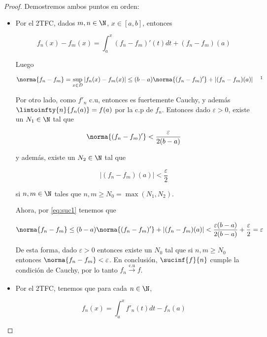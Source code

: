 \begin{proof}
    Demostremos ambos puntos en orden:
    
    \begin{itemize}
        \item Por el 2TFC, dados $m,n \in \N$, $x \in [a,b]$, entonces
    
        \[
        f_n(x) - f_m(x) = \int_a^x (f_n - f_m)'(t)dt + (f_n - f_m)(a)
        \]
        
        Luego
        
        \begin{equation}\label{eq:suc1}
            \norma{f_n - f_m} = \sup_{x \in D} \left| f_n(x) - f_m(x) \right| \leq (b-a)\norma{(f_n - f_m)'} + \left| (f_n - f_m)(a) \right| \quad \footnotemark
        \end{equation}
        
        Por otro lado, como $f'_n$ c.u, entonces es fuertemente Cauchy, y además $\limtoinfty{n}{f_n(a)} = f(a)$ por la c.p de $f_n$. Entonces dado $\varepsilon > 0$, existe un $N_1 \in \N$ tal que
        
        \[
        \norma{(f_n - f_m)'} < \frac{\varepsilon}{2(b-a)}
        \]
        
        \noindent y además, existe un $N_2 \in \N$ tal que
        
        \[
        \left| (f_n - f_m)(a) \right| < \frac{\varepsilon}{2}
        \]
        
        \noindent si $n, m \in \N$ tales que $n, m \geq N_0 = \max(N_1, N_2)$.
        
        Ahora, por \ref{eq:suc1} tenemos que
        
        \[
        \norma{f_n - f_m} \leq (b-a)\norma{(f_n - f_m)'} + \left| (f_n - f_m)(a) \right| < \frac{\varepsilon(b-a)}{2(b-a)} + \frac{\varepsilon}{2} = \varepsilon
        \]
        
        De esta forma, dado $\varepsilon > 0$ entonces existe un $N_0$ tal que si $n, m \geq N_0$ entonces $\norma{f_n - f_m} < \varepsilon$. En conclusión, $\sucinf{f}{n}$ cumple la condición de Cauchy, por lo tanto $f_n \xrightarrow[]{\text{c.u}} f$.
        
        \item Por el 2TFC, tenemos que para cada $n \in \N$,
        
        \[
        f_n(x) = \int_a^x f'_n(t)dt - f_n(a)
        \]
        

\end{itemize}
\end{proof}

